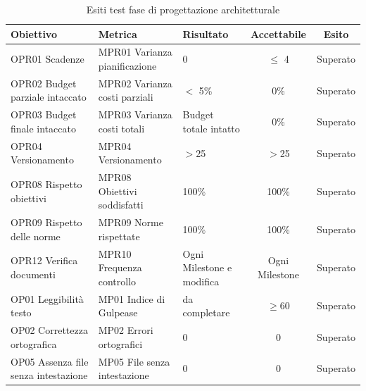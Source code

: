 \documentclass[../piano_di_qualifica.tex]{subfiles}
\begin{document}
\begin{table}[!ht]
	\centering
	\begin{tabular}{|p{4cm}|p{4cm}|l|c|c|}
		\hline
		\rowcolor{lightgray}
		\textbf{Obiettivo}            			& \textbf{Metrica}              & \textbf{Risultato}                    & \textbf{Accettabile} & \textbf{Esito} \\
		\hline
		OPR01 Scadenze		        			& MPR01 Varianza pianificazione & 0                             		& $\leq$ 4           	& Superato   \\
		OPR02 Budget parziale intaccato        	& MPR02 Varianza costi parziali & $<$ 5\%								& 0\%                  & Superato   \\
		OPR03 Budget finale intaccato        	& MPR03 Varianza costi totali   & Budget totale intatto					& 0\%                  & Superato       \\
		OPR04 Versionamento						& MPR04 Versionamento			& $>$25									&$>$25					& Superato	\\
		OPR08 Rispetto obiettivi      			& MPR08 Obiettivi soddisfatti   & 100\%                                 & 100\%                & Superato       \\
		OPR09 Rispetto delle norme   			& MPR09 Norme rispettate        & 100\%                                 & 100\%                & Superato       \\
		OPR12 Verifica documenti      			& MPR10 Frequenza controllo     & Ogni Milestone e modifica         	& Ogni Milestone       & Superato       \\
		OP01 Leggibilità testo       			& MP01 Indice di Gulpease      & da completare                         & \(\ge 60\)           & Superato       \\
		OP02 Correttezza ortografica 			& MP02 Errori ortografici      & 0                                     & 0                    & Superato       \\
		OP05 Assenza file senza intestazione	& MP05 File senza intestazione 	& 0										& 0						& Superato		\\
		\hline
	\end{tabular}
	\caption{Esiti test fase di progettazione architetturale}
\end{table}
\end{document}
